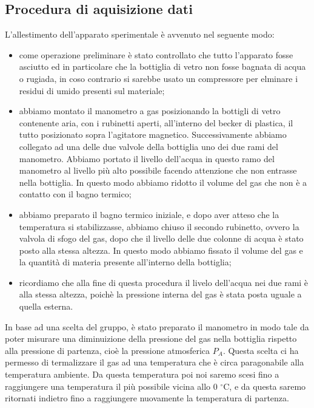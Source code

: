 \subsection{Procedura di aquisizione dati}
L'allestimento dell'apparato sperimentale è avvenuto nel seguente modo:

\begin{itemize}
	\item{come operazione preliminare è stato controllato che tutto l'apparato fosse asciutto ed in particolare che la bottiglia di vetro non fosse bagnata di acqua o rugiada, in coso contrario si sarebbe usato un compressore per elminare i residui di umido presenti sul materiale;}
	\item{abbiamo montato il manometro a gas posizionando la bottigli di vetro contenente aria, con i rubinetti aperti, all'interno del becker di plastica, il tutto posizionato sopra l'agitatore magnetico. Successivamente abbiamo collegato ad una delle due valvole della bottiglia uno dei due rami del manometro. Abbiamo portato il livello dell'acqua in questo ramo del manometro al livello più alto possibile facendo attenzione che non entrasse nella bottiglia. In questo modo abbiamo ridotto il volume del gas che non è a contatto con il bagno termico;}
	\item{abbiamo preparato il bagno termico iniziale, e dopo aver atteso che la temperatura si stabilizzasse, abbiamo chiuso il secondo rubinetto, ovvero la valvola di sfogo del gas, dopo che il livello delle due colonne di acqua è stato posto alla stessa altezza. In questo modo abbiamo fissato il volume del gas e la quantità di materia presente all'interno della bottiglia;}
	\item{ricordiamo che alla fine di questa procedura il livelo dell'acqua nei due rami è alla stessa altezza, poichè la pressione interna del gas è stata posta uguale a quella esterna.}
\end{itemize}
%

In base ad una scelta del gruppo, è stato preparato il manometro in modo tale da poter misurare una diminuizione della pressione del gas nella bottiglia rispetto alla pressione di partenza, cioè la pressione atmosferica $P_A$. Questa scelta ci ha permesso di termalizzare il gas ad una temperatura che è circa paragonabile alla temperatura ambiente. Da questa temperatura poi noi saremo scesi fino a raggiungere una temperatura il più possibile vicina allo 0 $^\circ$C, e da questa saremo ritornati indietro fino a raggiungere nuovamente la temperatura di partenza.

